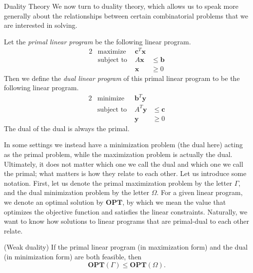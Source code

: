 \begin{section}{Duality Theory}
	We now turn to duality theory, which allows us to speak more generally about the relationships 
	between certain combinatorial problems that we are interested in solving.
	\begin{definition}
		Let the \emph{primal linear program} be the following linear program.
		\begin{alignat*}{2}
			& \text{maximize } & \mathbf{c}^{T}\mathbf{x} \\
			& \text{subject to } & A\mathbf{x} & \leq \mathbf{b} \\
			&& \mathbf{x} &\geq 0
		\end{alignat*}
		Then we define the \emph{dual linear program} of this primal linear program to be the 
		following linear program.
		\begin{alignat*}{2}
			& \text{minimize } & \mathbf{b}^{T}\mathbf{y} \\
			& \text{subject to } & A^{T}\mathbf{y} & \leq \mathbf{c} \\
			&& \mathbf{y} &\geq 0
		\end{alignat*}
		The dual of the dual is always the primal.
	\end{definition}
	In some settings we instead 
	have a minimization problem (the dual here) acting as the primal problem, while the maximization 
	problem is actually the dual. Ultimately, it does not matter which one we call the dual and
	which one we call the primal; what matters is how they relate to each other. 
	Let us introduce some 
	notation. First, let us denote the primal maximization problem by the letter $\Gamma$, and 
	the dual minimization problem by the letter $\Omega$. For a given linear program, we denote 
	an optimal solution by $\mathbf{OPT}$, by which we mean the value that optimizes the objective 
	function and satisfies the linear constraints. Naturally, we want to know how solutions to 
	linear programs that are primal-dual to each other relate.

	\begin{theorem}{(Weak duality)}
		If the primal linear program (in maximization form) and the dual (in minimization 
		form) are both feasible, then 
		\[
			\mathbf{OPT}(\Gamma) \leq \mathbf{OPT}(\Omega).
		\]
	\end{theorem}


\end{section}
